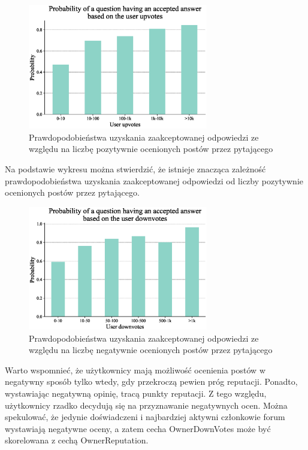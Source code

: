 \documentclass[12pt]{article}
\begin{document}
	\begin{figure}[H]
		\centering
		\includegraphics[width=0.7\textwidth]{user_upvotes}
		\caption{Prawdopodobieństwa uzyskania zaakceptowanej odpowiedzi ze względu na liczbę pozytywnie ocenionych postów przez pytającego}
		\label{fig:prawdopodobienstwa-uzyskania-odpowiedzi-upvotes}
	\end{figure}
	Na podstawie wykresu można stwierdzić, że istnieje znacząca zależność prawdopodobieństwa uzyskania zaakceptowanej odpowiedzi od liczby pozytywnie ocenionych postów przez pytającego.
	
	\begin{figure}[H]
		\centering
		\includegraphics[width=0.7\textwidth]{user_downvotes}
		\caption{Prawdopodobieństwa uzyskania zaakceptowanej odpowiedzi ze względu na liczbę negatywnie ocenionych postów przez pytającego}
		\label{fig:prawdopodobienstwa-uzyskania-odpowiedzi-downvotes}
	\end{figure}
	Warto wspomnieć, że użytkownicy mają możliwość ocenienia postów w negatywny sposób tylko wtedy, gdy przekroczą pewien próg reputacji. Ponadto, wystawiając negatywną opinię, tracą punkty reputacji. Z tego względu, użytkownicy rzadko decydują się na przyznawanie negatywnych ocen. Można spekulować, że jedynie doświadczeni i najbardziej aktywni członkowie forum wystawiają negatywne oceny, a zatem cecha OwnerDownVotes może być skorelowana z cechą OwnerReputation.
	
\end{document}
